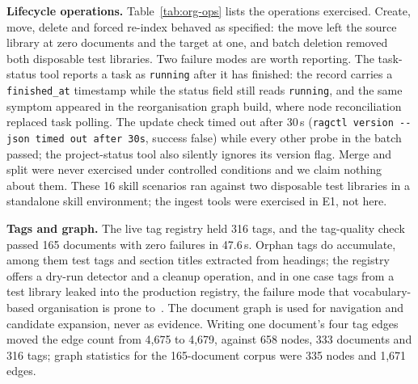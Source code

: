 \textbf{Lifecycle operations.} Table~\ref{tab:org-ops} lists the operations exercised. Create, move, delete and forced re-index behaved as specified: the move left the source library at zero documents and the target at one, and batch deletion removed both disposable test libraries. Two failure modes are worth reporting. The task-status tool reports a task as \texttt{running} after it has finished: the record carries a \texttt{finished\_at} timestamp while the status field still reads \texttt{running}, and the same symptom appeared in the reorganisation graph build, where node reconciliation replaced task polling. The update check timed out after 30\,s (\texttt{ragctl version -{}-json timed out after 30s}, success false) while every other probe in the batch passed; the project-status tool also silently ignores its version flag. Merge and split were never exercised under controlled conditions and we claim nothing about them. These 16 skill scenarios ran against two disposable test libraries in a standalone skill environment; the ingest tools were exercised in E1, not here.



\textbf{Tags and graph.} The live tag registry held 316 tags, and the tag-quality check passed 165 documents with zero failures in 47.6\,s. Orphan tags do accumulate, among them test tags and section titles extracted from headings; the registry offers a dry-run detector and a cleanup operation, and in one case tags from a test library leaked into the production registry, the failure mode that vocabulary-based organisation is prone to~\cite{golder-tagging-2006}. The document graph is used for navigation and candidate expansion, never as evidence. Writing one document's four tag edges moved the edge count from 4{,}675 to 4{,}679, against 658 nodes, 333 documents and 316 tags; graph statistics for the 165-document corpus were 335 nodes and 1{,}671 edges.
